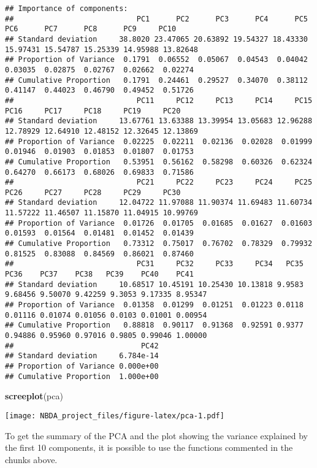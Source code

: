 \documentclass[
]{article}
\newenvironment{Shaded}{\begin{snugshade}}{\end{snugshade}}
\newcommand{\FunctionTok}[1]{\textcolor[rgb]{0.13,0.29,0.53}{\textbf{#1}}}
\newcommand{\NormalTok}[1]{#1}
\begin{document}
\begin{verbatim}
## Importance of components:
##                            PC1      PC2      PC3      PC4      PC5      PC6      PC7      PC8      PC9     PC10
## Standard deviation     38.8020 23.47065 20.63892 19.54327 18.43330 15.97431 15.54787 15.25339 14.95988 13.82648
## Proportion of Variance  0.1791  0.06552  0.05067  0.04543  0.04042  0.03035  0.02875  0.02767  0.02662  0.02274
## Cumulative Proportion   0.1791  0.24461  0.29527  0.34070  0.38112  0.41147  0.44023  0.46790  0.49452  0.51726
##                            PC11     PC12     PC13     PC14     PC15     PC16     PC17     PC18     PC19     PC20
## Standard deviation     13.67761 13.63388 13.39954 13.05683 12.96288 12.78929 12.64910 12.48152 12.32645 12.13869
## Proportion of Variance  0.02225  0.02211  0.02136  0.02028  0.01999  0.01946  0.01903  0.01853  0.01807  0.01753
## Cumulative Proportion   0.53951  0.56162  0.58298  0.60326  0.62324  0.64270  0.66173  0.68026  0.69833  0.71586
##                            PC21     PC22     PC23     PC24     PC25     PC26     PC27     PC28     PC29     PC30
## Standard deviation     12.04722 11.97088 11.90374 11.69483 11.60734 11.57222 11.46507 11.15870 11.04915 10.99769
## Proportion of Variance  0.01726  0.01705  0.01685  0.01627  0.01603  0.01593  0.01564  0.01481  0.01452  0.01439
## Cumulative Proportion   0.73312  0.75017  0.76702  0.78329  0.79932  0.81525  0.83088  0.84569  0.86021  0.87460
##                            PC31     PC32     PC33     PC34   PC35    PC36    PC37    PC38   PC39    PC40    PC41
## Standard deviation     10.68517 10.45191 10.25430 10.13818 9.9583 9.68456 9.50070 9.42259 9.3053 9.17335 8.95347
## Proportion of Variance  0.01358  0.01299  0.01251  0.01223 0.0118 0.01116 0.01074 0.01056 0.0103 0.01001 0.00954
## Cumulative Proportion   0.88818  0.90117  0.91368  0.92591 0.9377 0.94886 0.95960 0.97016 0.9805 0.99046 1.00000
##                             PC42
## Standard deviation     6.784e-14
## Proportion of Variance 0.000e+00
## Cumulative Proportion  1.000e+00
\end{verbatim}

\begin{Shaded}
\begin{Highlighting}[]
\FunctionTok{screeplot}\NormalTok{(pca)}
\end{Highlighting}
\end{Shaded}

\texttt{[image: NBDA\_project\_files/figure-latex/pca-1.pdf]}

To get the summary of the PCA and the plot showing the variance
explained by the first 10 components, it is possible to use the
functions commented in the chunks above.
\end{document}
